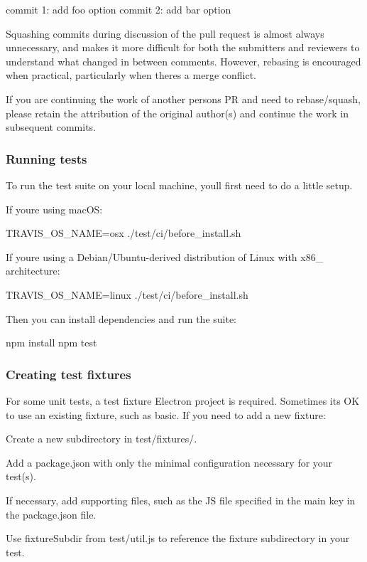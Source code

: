 \begin{DoxyCode}
commit 1: add foo option
commit 2: add bar option
\end{DoxyCode}


Squashing commits during discussion of the pull request is almost always unnecessary, and makes it more difficult for both the submitters and reviewers to understand what changed in between comments. However, rebasing is encouraged when practical, particularly when there\textquotesingle{}s a merge conflict.

If you are continuing the work of another person\textquotesingle{}s PR and need to rebase/squash, please retain the attribution of the original author(s) and continue the work in subsequent commits.

\subsubsection*{Running tests}

To run the test suite on your local machine, you\textquotesingle{}ll first need to do a little setup.

If you\textquotesingle{}re using mac\+OS\+:


\begin{DoxyCode}
TRAVIS\_OS\_NAME=osx ./test/ci/before\_install.sh
\end{DoxyCode}


If you\textquotesingle{}re using a Debian/\+Ubuntu-\/derived distribution of Linux with x86\+\_ architecture\+:


\begin{DoxyCode}
TRAVIS\_OS\_NAME=linux ./test/ci/before\_install.sh
\end{DoxyCode}


Then you can install dependencies and run the suite\+:


\begin{DoxyCode}
npm install
npm test
\end{DoxyCode}


\subsubsection*{Creating test fixtures}

For some unit tests, a test fixture Electron project is required. Sometimes it\textquotesingle{}s OK to use an existing fixture, such as {\ttfamily basic}. If you need to add a new fixture\+:


\begin{DoxyEnumerate}
\item Create a new subdirectory in {\ttfamily test/fixtures/}.
\item Add a {\ttfamily package.\+json} with only the minimal configuration necessary for your test(s).
\item If necessary, add supporting files, such as the JS file specified in the {\ttfamily main} key in the {\ttfamily package.\+json} file.
\item Use {\ttfamily fixture\+Subdir} from {\ttfamily test/util.\+js} to reference the fixture subdirectory in your test.
\end{DoxyEnumerate}

